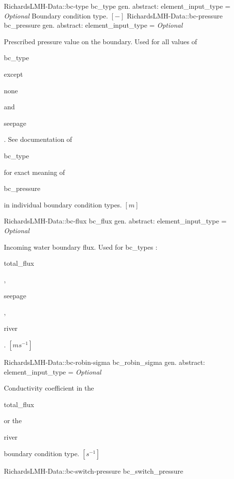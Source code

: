 \begin{RecordType}
{{}}
		\RecKey
			{RichardsLMH-Data::bc-type}
			{bc{\_}type}
			{{gen. abstract: }}{{element{\_}input{\_}type}{ = }}
			{ \it{Optional}}
			{{{Boundary condition type. }{$[-]$}%
}}
		\RecKey
			{RichardsLMH-Data::bc-pressure}
			{bc{\_}pressure}
			{{gen. abstract: }}{{element{\_}input{\_}type}{ = }}
			{ \it{Optional}}
			{{{Prescribed pressure value on the boundary.
Used for all values of }\begin{ttfamily}bc{\_}type\end{ttfamily}{ except }\begin{ttfamily}none\end{ttfamily}{ and }\begin{ttfamily}seepage\end{ttfamily}{. See documentation of }\begin{ttfamily}bc{\_}type\end{ttfamily}{ for exact meaning of }\begin{ttfamily}bc{\_}pressure\end{ttfamily}{ in individual boundary condition types. }{$[m]$}%
}}
		\RecKey
			{RichardsLMH-Data::bc-flux}
			{bc{\_}flux}
			{{gen. abstract: }}{{element{\_}input{\_}type}{ = }}
			{ \it{Optional}}
			{{{Incoming water boundary flux.
Used for bc{\_}types : }\begin{ttfamily}total{\_}flux\end{ttfamily}{, }\begin{ttfamily}seepage\end{ttfamily}{, }\begin{ttfamily}river\end{ttfamily}{. }{$[ms^{-1}]$}%
}}
		\RecKey
			{RichardsLMH-Data::bc-robin-sigma}
			{bc{\_}robin{\_}sigma}
			{{gen. abstract: }}{{element{\_}input{\_}type}{ = }}
			{ \it{Optional}}
			{{{Conductivity coefficient in the }\begin{ttfamily}total{\_}flux\end{ttfamily}{ or the }\begin{ttfamily}river\end{ttfamily}{ boundary condition type. }{$[s^{-1}]$}%
}}
		\RecKey
			{RichardsLMH-Data::bc-switch-pressure}
			{bc{\_}switch{\_}pressure}

\end{RecordType}
